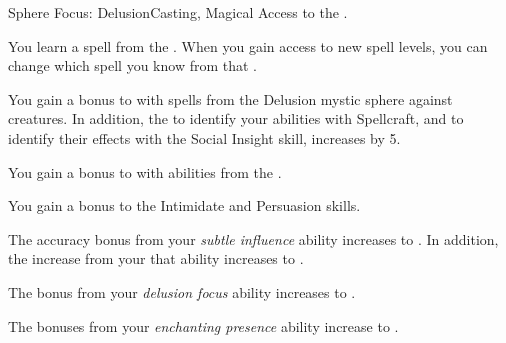     \begin{feat}{Sphere Focus: Delusion}{Casting, Magical}
        \featpre Access to the  .

         You learn a spell from the  .
        When you gain access to new spell levels, you can change which spell you know from that .

         You gain a  bonus to  with spells from the Delusion mystic sphere against  creatures.
        In addition, the  to identify your  abilities with Spellcraft, and to identify their effects with the Social Insight skill, increases by 5.

         You gain a  bonus to  with abilities from the  .

         You gain a  bonus to the Intimidate and Persuasion skills.

         The accuracy bonus from your \textit{subtle influence} ability increases to .
        In addition, the  increase from your that ability increases to .

         The bonus from your \textit{delusion focus} ability increases to .

         The bonuses from your \textit{enchanting presence} ability increase to .
    \end{feat}

